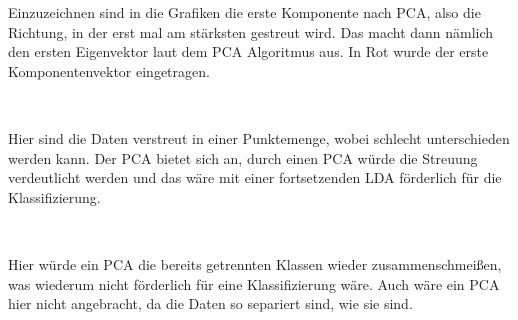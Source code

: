 \begin{aufgabe}
\end{aufgabe}

Einzuzeichnen sind in die Grafiken die erste Komponente nach PCA, also die Richtung, in der erst mal am stärksten gestreut wird. Das macht dann nämlich den ersten Eigenvektor laut dem PCA Algoritmus aus. In Rot wurde der erste Komponentenvektor eingetragen.

\begin{center}
	\\
\end{center}
Hier sind die Daten verstreut in einer Punktemenge, wobei schlecht unterschieden werden kann. Der PCA bietet sich an, durch einen PCA würde die Streuung verdeutlicht werden und das wäre mit einer fortsetzenden LDA förderlich für die Klassifizierung.
\begin{center}
	\\
\end{center}
Hier würde ein PCA die bereits getrennten Klassen wieder zusammenschmeißen, was wiederum nicht förderlich für eine Klassifizierung wäre. Auch wäre ein PCA hier nicht angebracht, da die Daten so separiert sind, wie sie sind.
\begin{center}
	\\
\end{center}
